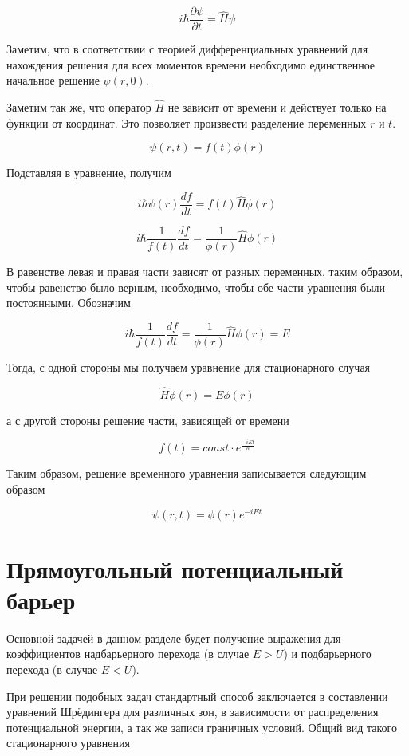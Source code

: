 \documentclass[a4paper, 12pt]{article}
\begin{document}
    \begin{equation}
        i \hbar \frac{\partial \psi}{\partial t} = \hat{H} \psi
    \end{equation}

    Заметим, что в соответствии с теорией дифференциальных уравнений для нахождения решения 
    для всех моментов времени необходимо единственное начальное решение $\psi(r, 0)$.

    Заметим так же, что оператор $\hat{H}$ не зависит от времени и действует только на функции от координат. Это позволяет
    произвести разделение переменных $r$ и $t$.

    \[ \psi(r, t) = f(t) \phi(r) \]

    Подставляя в уравнение, получим

    \[ i \hbar \psi(r) \frac{df}{dt} = f(t) \hat{H} \phi(r) \]

    \[ i \hbar \frac{1}{f(t)} \frac{df}{dt} = \frac{1}{\phi(r)} \hat{H} \phi(r) \]

    В равенстве левая и правая части зависят от разных переменных, таким образом, чтобы равенство было верным,
    необходимо, чтобы обе части уравнения были постоянными. Обозначим

    \[ i \hbar \frac{1}{f(t)} \frac{df}{dt} = \frac{1}{\phi(r)} \hat{H} \phi(r) = E \]

     Тогда, с одной стороны мы получаем уравнение для стационарного случая

     \[ \hat{H} \phi(r) = E \phi(r) \]

     а с другой стороны решение части, зависящей от времени

     \[ f(t) = const \cdot e^{\frac{-iEt}{\hbar}} \]

     Таким образом, решение временного уравнения записывается следующим образом

     \begin{equation}
         \psi(r, t) = \phi(r) e^{-iEt}
     \end{equation}
    
    \section{Прямоугольный потенциальный барьер}

    Основной задачей в данном разделе будет получение выражения для коэффициентов надбарьерного перехода (в случае
    $E > U$) и подбарьерного перехода (в случае $E < U$).

    При решении подобных задач стандартный способ заключается в составлении уравнений Шрёдингера для различных зон,
    в зависимости от распределения потенциальной энергии, а так же записи граничных условий. Общий вид такого
    стационарного уравнения
\end{document}
